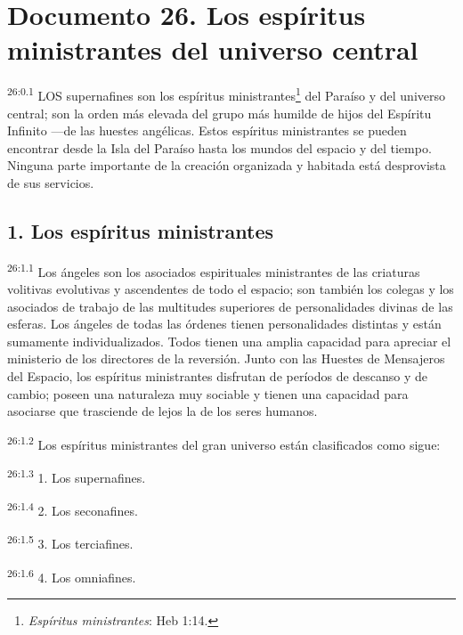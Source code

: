 \chapter{Documento 26. Los espíritus ministrantes del universo central}
\par
\textsuperscript{26:0.1} LOS supernafines son los espíritus ministrantes\footnote{\textit{Espíritus ministrantes}: Heb 1:14.} del Paraíso y del universo central; son la orden más elevada del grupo más humilde de hijos del Espíritu Infinito ---de las huestes angélicas. Estos espíritus ministrantes se pueden encontrar desde la Isla del Paraíso hasta los mundos del espacio y del tiempo. Ninguna parte importante de la creación organizada y habitada está desprovista de sus servicios.

\section*{1. Los espíritus ministrantes}
\par
\textsuperscript{26:1.1} Los ángeles son los asociados espirituales ministrantes de las criaturas volitivas evolutivas y ascendentes de todo el espacio; son también los colegas y los asociados de trabajo de las multitudes superiores de personalidades divinas de las esferas. Los ángeles de todas las órdenes tienen personalidades distintas y están sumamente individualizados. Todos tienen una amplia capacidad para apreciar el ministerio de los directores de la reversión. Junto con las Huestes de Mensajeros del Espacio, los espíritus ministrantes disfrutan de períodos de descanso y de cambio; poseen una naturaleza muy sociable y tienen una capacidad para asociarse que trasciende de lejos la de los seres humanos.

\par
\textsuperscript{26:1.2} Los espíritus ministrantes del gran universo están clasificados como sigue:

\par
\textsuperscript{26:1.3} 1. Los supernafines.

\par
\textsuperscript{26:1.4} 2. Los seconafines.

\par
\textsuperscript{26:1.5} 3. Los terciafines.

\par
\textsuperscript{26:1.6} 4. Los omniafines.

